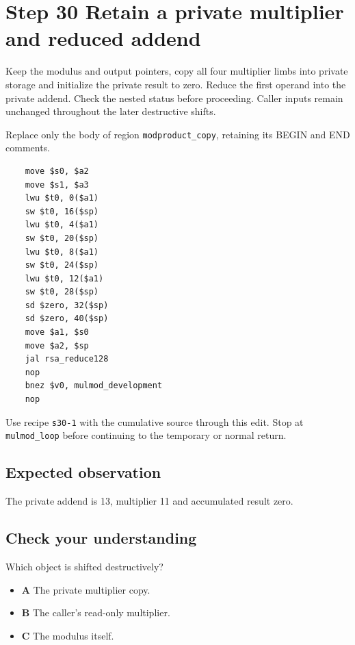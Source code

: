 \section{Step 30 Retain a private multiplier and reduced addend}\label{rsa-s30}

Keep the modulus and output pointers, copy all four multiplier limbs into private storage and initialize the private result to zero. Reduce the first operand into the private addend. Check the nested status before proceeding. Caller inputs remain unchanged throughout the later destructive shifts.

Replace only the body of region \texttt{modproduct\_copy}, retaining its BEGIN and END comments.

\begin{verbatim}
    move $s0, $a2
    move $s1, $a3
    lwu $t0, 0($a1)
    sw $t0, 16($sp)
    lwu $t0, 4($a1)
    sw $t0, 20($sp)
    lwu $t0, 8($a1)
    sw $t0, 24($sp)
    lwu $t0, 12($a1)
    sw $t0, 28($sp)
    sd $zero, 32($sp)
    sd $zero, 40($sp)
    move $a1, $s0
    move $a2, $sp
    jal rsa_reduce128
    nop
    bnez $v0, mulmod_development
    nop
\end{verbatim}

Use recipe \texttt{s30-1} with the cumulative source through this edit. Stop at \texttt{mulmod\_loop} before continuing to the temporary or normal return.

\subsection{Expected observation}
The private addend is 13, multiplier 11 and accumulated result zero.

\subsection{Check your understanding}
Which object is shifted destructively?

\begin{itemize}
  \item \textbf{A} The private multiplier copy.
  \item \textbf{B} The caller's read-only multiplier.
  \item \textbf{C} The modulus itself.
\end{itemize}
